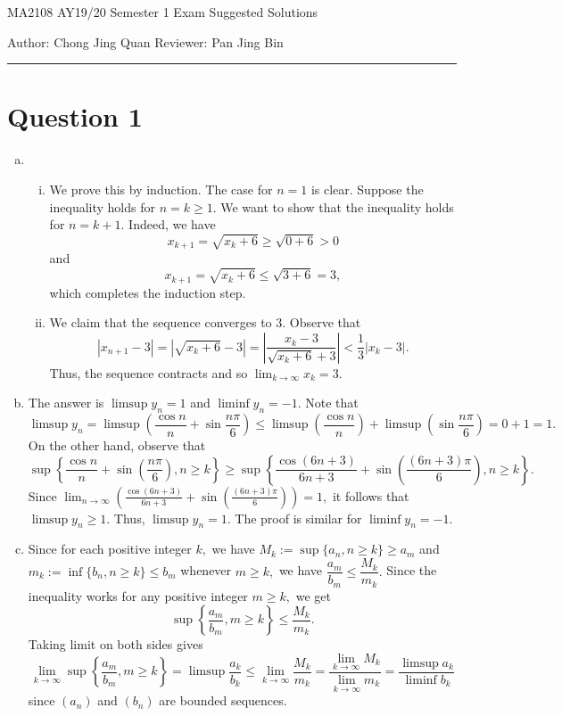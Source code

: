 \documentclass{article}
\begin{document}
    {\LARGE{MA2108 AY19/20 Semester 1 Exam Suggested Solutions}}
    \vspace{0.2in}
    
    Author: Chong Jing Quan \hfill Reviewer: Pan Jing Bin
    
    \par\noindent\rule{\textwidth}{0.4pt}
\section*{Question 1}
\begin{enumerate}[(a)]
    \item \begin{enumerate}[(i)]
        \item We prove this by induction. The case for $n=1$ is clear. Suppose the inequality holds for $n=k\geq1.$ We want to show that the inequality holds for $n=k+1.$ Indeed, we have $$x_{k+1}=\sqrt{x_k+6}\geq\sqrt{0+6}>0$$ and $$x_{k+1}=\sqrt{x_k+6}\leq\sqrt{3+6}=3,$$ which completes the induction step.
        \item We claim that the sequence converges to 3. Observe that $$|x_{n+1}-3|=|\sqrt{x_k+6}-3|=\left|\frac{x_k-3}{\sqrt{x_k+6}+3}\right|<\frac{1}{3}|x_k-3|.$$ Thus, the sequence contracts and so $\displaystyle\lim_{k\to\infty}x_k=3.$
    \end{enumerate}
    \item The answer is $\limsup y_n=1$ and $\liminf y_n=-1.$ Note that
    $$\limsup y_n=\limsup \left(\frac{\cos n}{n}+\sin\frac{n\pi}{6}\right)\leq\limsup\left(\frac{\cos n}{n}\right)+\limsup\left(\sin\frac{n\pi}{6}\right)=0+1=1.$$
    On the other hand, observe that $$\sup\left\{\frac{\cos n}{n}+\sin\left(\frac{n\pi}{6}\right),n\geq k\right\}\geq \sup\left\{\frac{\cos(6n+3)}{6n+3}+\sin\left(\frac{(6n+3)\pi}{6}\right),n\geq k\right\}.$$
    Since $\displaystyle\lim_{n\to\infty}\left(\frac{\cos(6n+3)}{6n+3}+\sin\left(\frac{(6n+3)\pi}{6}\right)\right)=1,$ it follows that $\limsup y_n\geq1.$ Thus, $\limsup y_n=1.$ The proof is similar for $\liminf y_n=-1.$
    \item Since for each positive integer $k,$ we have $M_k:=\sup \{a_n, n\geq k\}\geq a_m$ and $m_k:=\inf \{b_n, n\geq k\}\leq b_m$ whenever $m\geq k,$ we have $\dfrac{a_m}{b_m}\leq \dfrac{M_k}{m_k}.$ Since the inequality works for any positive integer $m\geq k,$ we get $$\sup\left\{\dfrac{a_m}{b_m},m\geq k\right\}\leq \dfrac{M_k}{m_k}.$$ Taking limit on both sides gives $$\lim_{k\to\infty}\sup\left\{\dfrac{a_m}{b_m},m\geq k\right\}=\limsup\frac{a_k}{b_k}\leq \lim_{k\to\infty}\dfrac{M_k}{m_k}=\dfrac{\lim_{k\to\infty}M_k}{\lim_{k\to\infty}m_k}=\frac{\limsup a_k}{\liminf b_k}$$ since $(a_n)$ and $(b_n)$ are bounded sequences.
\end{enumerate}
\end{document}
